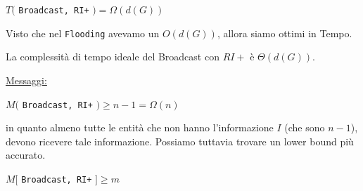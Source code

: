 \begin{center}
    $T($ \texttt{Broadcast, RI+} $) = \Omega(d(G))$
\end{center}

Visto che nel \texttt{Flooding} avevamo un $O(d(G))$, allora siamo ottimi in
Tempo.

\begin{theorem}
    La complessità di tempo ideale del Broadcast con $RI+$ è
    $\Theta(d(G))$.
\end{theorem}

\underline{Messaggi:}

\begin{center}
    $M($ \texttt{Broadcast, RI+} $) \geq n-1 =  \Omega(n)$
\end{center}

in quanto almeno tutte le entità che non hanno l'informazione $I$ (che sono
$n-1$), devono ricevere tale informazione. Possiamo tuttavia trovare un lower
bound più accurato.

\begin{theorem}
    $M[$ \texttt{Broadcast, RI+} $] \geq m$
\end{theorem}


